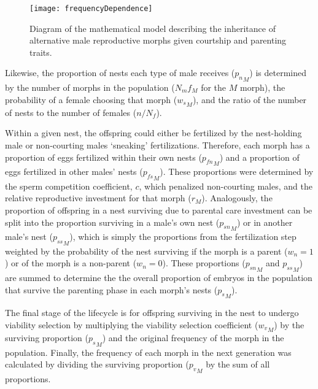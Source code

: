 \documentclass[
  11pt,
]{article}
\begin{document}
\begin{figure}[H]
\texttt{[image: frequencyDependence]} \caption{Diagram of the mathematical model describing the inheritance of alternative male reproductive morphs given courtship and parenting traits.}\label{fig:mathModel}
\end{figure}

Likewise, the proportion of nests each type of male receives (\({p_n}_M\))
is determined by the number of morphs in the population (\(N_mf_M\) for
the \(M\) morph), the probability of a female choosing that morph
(\({w_s}_M\)), and the ratio of the number of nests to the number of
females (\(n/N_f\)).

Within a given nest, the offspring could either be fertilized by the
nest-holding male or non-courting males `sneaking' fertilizations.
Therefore, each morph has a proportion of eggs fertilized within their
own nests (\({p_{fn}}_M\)) and a proportion of eggs fertilized in other
males' nests (\({p_{fs}}_M\)). These proportions were determined by the
sperm competition coefficient, \(c\), which penalized non-courting males,
and the relative reproductive investment for that morph (\(r_M\)).
Analogously, the proportion of offspring in a nest surviving due to
parental care investment can be split into the proportion surviving in a
male's own nest (\({p_{sn}}_M\)) or in another male's nest (\({p_{ss}}_M\)),
which is simply the proportions from the fertilization step weighted by
the probability of the nest surviving if the morph is a parent (\(w_n=1\))
or of the morph is a non-parent (\(w_n=0\)). These proportions
(\({p_{sn}}_M\) and \({p_{ss}}_M\)) are summed to determine the the overall
proportion of embryos in the population that survive the parenting phase
in each morph's nests (\({p_s}_M\)).

The final stage of the lifecycle is for offspring surviving in the nest
to undergo viability selection by multiplying the viability selection
coefficient (\({w_v}_M\)) by the surviving proportion (\({p_s}_M\)) and the
original frequency of the morph in the population. Finally, the
frequency of each morph in the next generation was calculated by
dividing the surviving proportion (\({p_v}_M\) by the sum of all
proportions.
\end{document}
